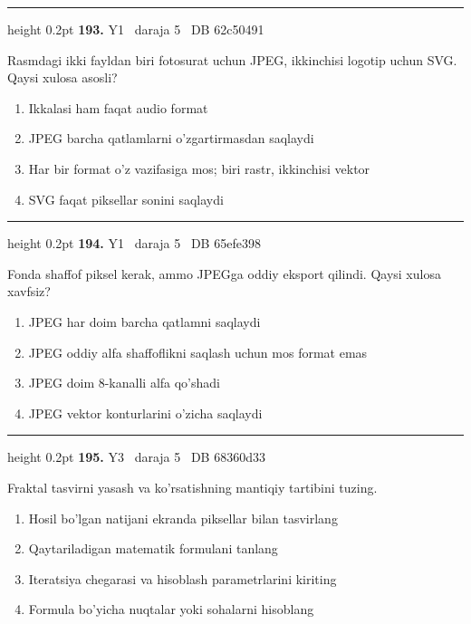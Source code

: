 \documentclass[10pt,a4paper,oneside]{article}
\begin{document}
\vspace{2mm}\hrule height 0.2pt \vspace{4mm}
\hypertarget{q193}{\textbf{\color{ink}193.}}  {\color{muted}\scriptsize Y1 \textbullet\ daraja 5 \textbullet\ DB 62c50491}
\par
Rasmdagi ikki fayldan biri fotosurat uchun JPEG, ikkinchisi logotip uchun SVG. Qaysi xulosa asosli?
\begin{enumerate}[label=\Alph*),leftmargin=9mm]
\item Ikkalasi ham faqat audio format
\item JPEG barcha qatlamlarni o'zgartirmasdan saqlaydi
\item Har bir format o'z vazifasiga mos; biri rastr, ikkinchisi vektor
\item SVG faqat piksellar sonini saqlaydi
\end{enumerate}
\vspace{2mm}\hrule height 0.2pt \vspace{4mm}
\hypertarget{q194}{\textbf{\color{ink}194.}}  {\color{muted}\scriptsize Y1 \textbullet\ daraja 5 \textbullet\ DB 65efe398}
\par
Fonda shaffof piksel kerak, ammo JPEGga oddiy eksport qilindi. Qaysi xulosa xavfsiz?
\begin{enumerate}[label=\Alph*),leftmargin=9mm]
\item JPEG har doim barcha qatlamni saqlaydi
\item JPEG oddiy alfa shaffoflikni saqlash uchun mos format emas
\item JPEG doim 8-kanalli alfa qo'shadi
\item JPEG vektor konturlarini o'zicha saqlaydi
\end{enumerate}
\vspace{2mm}\hrule height 0.2pt \vspace{4mm}
\hypertarget{q195}{\textbf{\color{ink}195.}}  {\color{muted}\scriptsize Y3 \textbullet\ daraja 5 \textbullet\ DB 68360d33}
\par
Fraktal tasvirni yasash va ko'rsatishning mantiqiy tartibini tuzing.
\begin{enumerate}[label=\Alph*),leftmargin=9mm]
\item Hosil bo'lgan natijani ekranda piksellar bilan tasvirlang
\item Qaytariladigan matematik formulani tanlang
\item Iteratsiya chegarasi va hisoblash parametrlarini kiriting
\item Formula bo'yicha nuqtalar yoki sohalarni hisoblang
\end{enumerate}
\end{document}
